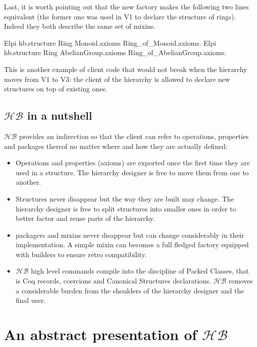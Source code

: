 \documentclass[a4paper,UKenglish,cleveref, autoref]{lipics-v2019}
\newcommand{\HB}{\ensuremath{\mathcal{HB}}}
\newcommand{\mixin}{mixin}
\newcommand{\mixins}{mixins}
\newcommand{\factory}{factory}
\newcommand{\Packager}{packager}
\newcommand{\builder}{builder}
\theoremstyle{implem}
\theoremstyle{implem}
\theoremstyle{axiom}
\theoremstyle{abscommand}
\theoremstyle{command}
\begin{document}
Last, it is worth pointing out that the new factory makes the following
two lines equivalent (the former one was used in V1 to declare
the structure of rings). Indeed they both describe the same set of \mixins{}.

\begin{coqcode}
Elpi hb.structure Ring Monoid.axioms Ring_of_Monoid.axioms.
Elpi hb.structure Ring AbelianGroup.axioms Ring_of_AbelianGroup.axioms.
\end{coqcode}

This is another example of client code that would not break when the hierarchy
moves from V1 to V3: the client of the hierarchy is allowed to declare new
structures on top of existing ones.

\subsection{\HB{} in a nutshell}

\HB{} provides an indirection so that the client can refer to operations,
properties and packages thereof no matter where and how they are actually
defined:

\begin{itemize}
\item Operations and properties (axioms) are exported once the first time they
      are used in a structure. The hierarchy designer is free to move them from
      one to another.
\item Structures never disappear but the way they are built may change.
      The hierarchy designer is free to split structures into smaller
      ones in order to better factor and reuse parts of the hierarchy.
\item \Packager{}s and \mixins{} never disappear but can change considerably
      in their implementation. A simple \mixin{} can becomes a full fledged
      \factory{} equipped with \builder{}s to ensure retro compatibility.
\item \HB{} high level commands compile into
      the discipline of Packed Classes, that is Coq records, coercions
      and Canonical Structures declarations. \HB{} removes a considerable burden
      from the shoulders of the hierarchy designer and the final user.
\end{itemize}

\section{An abstract presentation of \HB{}}
\end{document}
